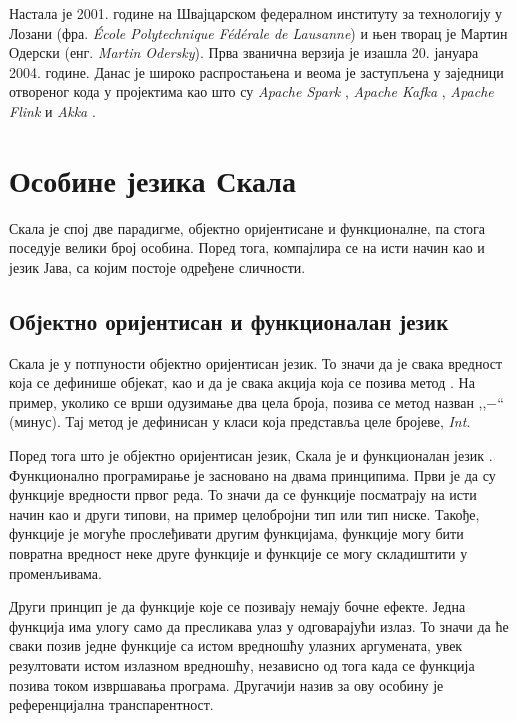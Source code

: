 \documentclass[12pt,oneside]{memoir}
\begin{document}
Настала је 2001. године на Швајцарском федералном институту за технологију у Лозани (фра. \textit{École Polytechnique Fédérale de Lausanne}) и њен творац је Мартин Одерски (енг. \textit{Martin Odersky}). Прва званична верзија је изашла 20. јануара 2004. године. Данас је широко распростањена и веома је заступљена у заједници отвореног кода у пројектима као што су \textit{Apache Spark} \cite{apache_spark}, \textit{Apache Kafka} \cite{apache_kafka}, \textit{Apache Flink} \cite{apache_flink} и \textit{Akka} \cite{scala_akka}.

\section{Особине језика Скала}
\label{sec:osоб_scala}


Скала је спој две парадигме, објектно оријентисане и функционалне, па стога поседује велики број особина. Поред тога, компајлира се на исти начин као и језик Јава, са којим постоје одређене сличности.

\subsection{Објектно оријентисан и функционалан језик}
\label{subsec:scala_obj_prog}

Скала је у потпуности објектно оријентисан језик. То значи да је свака вредност која се дефинише објекат, као и да је свака акција која се позива метод \cite{scala_prog}. На пример, уколико се врши одузимање два цела броја, позива се метод назван ,,$-$`` (минус). Тај метод је дефинисан у класи која представља целе бројеве, \textit{Int}. 

Поред тога што је објектно оријентисан језик, Скала је и функционалан језик \cite{scala_prog}. Функционално програмирање је засновано на двама принципима. Први је да су функције вредности првог реда. То значи да се функције посматрају на исти начин као и други типови, на пример целобројни тип или тип ниске. Такође, функције је могуће прослеђивати другим функцијама, функције могу бити повратна вредност неке друге функције и функције се могу складиштити у променљивама.

Други принцип је да функције које се позивају немају бочне ефекте. Једна функција има улогу само да пресликава улаз у одговарајући излаз. То значи да ће сваки позив једне функције са истом вредношћу улазних аргумената, увек резултовати истом излазном вредношћу, независно од тога када се функција позива током извршавања програма. Другачији назив за ову особину је референцијална транспарентност.
\end{document}
